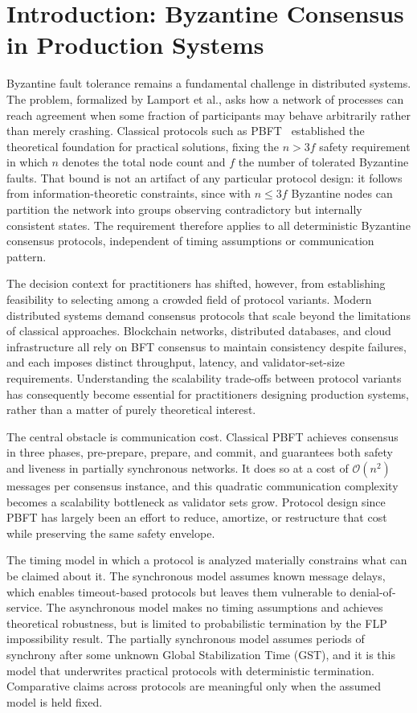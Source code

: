 \section{Introduction: Byzantine Consensus in Production Systems}

Byzantine fault tolerance remains a fundamental challenge in distributed systems. The problem, formalized by Lamport et al., asks how a network of processes can reach agreement when some fraction of participants may behave arbitrarily rather than merely crashing. Classical protocols such as PBFT~\cite{castro1999practical} established the theoretical foundation for practical solutions, fixing the $n > 3f$ safety requirement in which $n$ denotes the total node count and $f$ the number of tolerated Byzantine faults. That bound is not an artifact of any particular protocol design: it follows from information-theoretic constraints, since with $n \leq 3f$ Byzantine nodes can partition the network into groups observing contradictory but internally consistent states. The requirement therefore applies to all deterministic Byzantine consensus protocols, independent of timing assumptions or communication pattern.

The decision context for practitioners has shifted, however, from establishing feasibility to selecting among a crowded field of protocol variants. Modern distributed systems demand consensus protocols that scale beyond the limitations of classical approaches. Blockchain networks, distributed databases, and cloud infrastructure all rely on BFT consensus to maintain consistency despite failures, and each imposes distinct throughput, latency, and validator-set-size requirements. Understanding the scalability trade-offs between protocol variants has consequently become essential for practitioners designing production systems, rather than a matter of purely theoretical interest.

The central obstacle is communication cost. Classical PBFT achieves consensus in three phases, pre-prepare, prepare, and commit, and guarantees both safety and liveness in partially synchronous networks. It does so at a cost of $\mathcal{O}(n^2)$ messages per consensus instance, and this quadratic communication complexity becomes a scalability bottleneck as validator sets grow. Protocol design since PBFT has largely been an effort to reduce, amortize, or restructure that cost while preserving the same safety envelope.

The timing model in which a protocol is analyzed materially constrains what can be claimed about it. The synchronous model assumes known message delays, which enables timeout-based protocols but leaves them vulnerable to denial-of-service. The asynchronous model makes no timing assumptions and achieves theoretical robustness, but is limited to probabilistic termination by the FLP impossibility result. The partially synchronous model assumes periods of synchrony after some unknown Global Stabilization Time (GST), and it is this model that underwrites practical protocols with deterministic termination. Comparative claims across protocols are meaningful only when the assumed model is held fixed.

